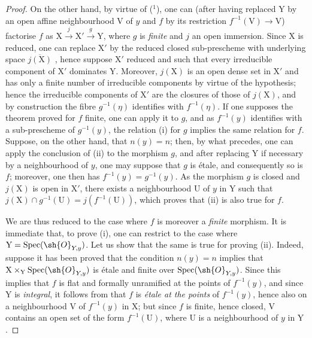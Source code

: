 \begin{proof}
On the other hand, by virtue of  (${}^1$), one can (after having replaced $\mathrm{Y}$ by an open affine neighbourhood $\mathrm{V}$ of $y$ and $f$ by its restriction $f^{-1}(\mathrm{V})\to\mathrm{V}$) factorise $f$ as $\mathrm{X}\xrightarrow{j}\mathrm{X}'\xrightarrow{g}\mathrm{Y}$, where $g$ is \emph{finite} and $j$ an open immersion.
Since $\mathrm{X}$ is reduced, one can replace $\mathrm{X}'$ by the reduced closed sub-prescheme with underlying space $\overline{j(\mathrm{X})}$ , hence suppose $\mathrm{X}'$ reduced and such that every irreducible component of $\mathrm{X}'$ dominates $\mathrm{Y}$.
Moreover, $j(\mathrm{X})$ is an open dense set in $\mathrm{X}'$ and has only a finite number of irreducible components by virtue of the hypothesis; hence  the irreducible components of $\mathrm{X}'$ are the closures of those of $j(\mathrm{X})$, and by construction the fibre $g^{-1}(\eta)$ identifies with $f^{-1}(\eta)$.
If one supposes the theorem proved for $f$ finite, one can apply it to $g$, and as $f^{-1}(y)$ identifies with a sub-prescheme of $g^{-1}(y)$, the relation (i) for $g$ implies the same relation for $f$.
Suppose, on the other hand, that $n(y)=n$; then, by what precedes, one can apply the conclusion of (ii) to the morphism $g$, and after replacing $\mathrm{Y}$ if necessary by a neighbourhood of $y$, one may suppose that $g$ is \'etale, and consequently so is $f$; moreover, one then has $f^{-1}(y)=g^{-1}(y)$.
As the morphism $g$ is closed and $j(\mathrm{X})$ is open in $\mathrm{X}'$, there exists a neighbourhood $\mathrm{U}$ of $y$ in $\mathrm{Y}$ such that $j(\mathrm{X})\cap g^{-1}(\mathrm{U})=j(f^{-1}(\mathrm{U}))$, which proves that (ii) is also true for $f$.

We are thus reduced to the case where $f$ is moreover a \emph{finite} morphism.
It is immediate that, to prove (i), one can restrict to the case where $\mathrm{Y}=\operatorname{Spec}(\sh{O}_{Y,y})$.
Let us show that the same is true for proving (ii).
Indeed, suppose it has been proved that the condition $n(y)=n$ implies that $\mathrm{X}\times_{\mathrm{Y}}\operatorname{Spec}(\sh{O}_{Y,y})$ is \'etale and finite over $\operatorname{Spec}(\sh{O}_{Y,y})$. Since this implies that $f$ is flat and formally unramified at the points of $f^{-1}(y)$, and since $\mathrm{Y}$ is \emph{integral}, it follows from  that $f$ is \emph{\'etale at the points} of $f^{-1}(y)$, hence also on a neighbourhood $\mathrm{V}$ of $f^{-1}(y)$ in $\mathrm{X}$; but since $f$ is finite, hence closed, $\mathrm{V}$ contains an open set of the form $f^{-1}(\mathrm{U})$, where $\mathrm{U}$ is a neighbourhood of $y$ in $\mathrm{Y}$.


\end{proof}

